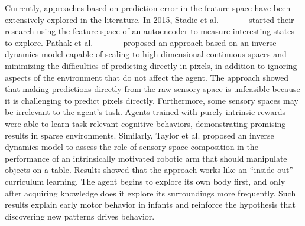 
Currently, approaches based on prediction error in the feature space have been extensively explored in the literature. In 2015, Stadie et al. ____ started their research using the feature space of an autoencoder to measure interesting states to explore. Pathak et al. ____ proposed an approach based on an inverse dynamics model capable of scaling to high-dimensional continuous spaces and minimizing the difficulties of predicting directly in pixels, in addition to ignoring aspects of the environment that do not affect the agent. The approach showed that making predictions directly from the raw sensory space is unfeasible because it is challenging to predict pixels directly. Furthermore, some sensory spaces may be irrelevant to the agent's task. Agents trained with purely intrinsic rewards were able to learn task-relevant cognitive behaviors, demonstrating promising results in sparse environments. Similarly, Taylor et al. proposed an inverse dynamics model to assess the role of sensory space composition in the performance of an intrinsically motivated robotic arm that should manipulate objects on a table. Results showed that the approach works like an ``inside-out'' curriculum learning. The agent begins to explore its own body first, and only after acquiring knowledge does it explore its surroundings more frequently. Such results explain early motor behavior in infants and reinforce the hypothesis that discovering new patterns drives behavior.



